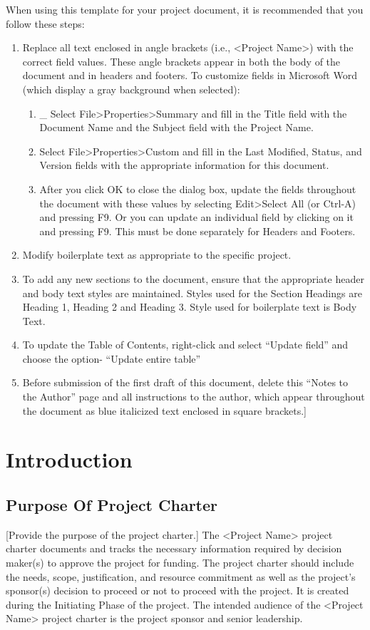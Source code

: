 \documentclass[11pt]{article}
\begin{document}
When using this template for your project document, it is recommended that you follow these steps:
\begin{enumerate}
\item Replace all text enclosed in angle brackets (i.e., <Project Name>) with the correct field values. These angle brackets appear in both the body of the document and in headers and footers.  To customize fields in Microsoft Word (which display a gray background when selected):
\begin{enumerate}
\item \_ Select File>Properties>Summary and fill in the Title field with the Document Name and the Subject field with the Project Name.
\item Select File>Properties>Custom and fill in the Last Modified, Status, and Version fields with the appropriate information for this document.
\item After you click OK to close the dialog box, update the fields throughout the document with these values by selecting Edit>Select All (or Ctrl-A) and pressing F9.  Or you can update an individual field by clicking on it and pressing F9. This must be done separately for Headers and Footers.
\end{enumerate}
\item Modify boilerplate text as appropriate to the specific project.
\item To add any new sections to the document, ensure that the appropriate header and body text styles are maintained.  Styles used for the Section Headings are Heading 1, Heading 2 and Heading 3.  Style used for boilerplate text is Body Text.
\item To update the Table of Contents, right-click and select “Update field” and choose the option- “Update entire table”
\item Before submission of the first draft of this document, delete this “Notes to the Author” page and all instructions to the author, which appear throughout the document as blue italicized text enclosed in square brackets.]
\end{enumerate}

\section{Introduction}
\label{sec:org8c828c5}
\subsection{Purpose Of Project Charter}
\label{sec:orgc0a81dd}
[Provide the purpose of the project charter.]
The <Project Name> project charter documents and tracks the necessary information required by decision maker(s) to approve the project for funding. The project charter should include the needs, scope, justification, and resource commitment as well as the project’s sponsor(s) decision to proceed or not to proceed with the project.  It is created during the Initiating Phase of the project.
The intended audience of the <Project Name> project charter is the project sponsor and senior leadership.
\end{document}
